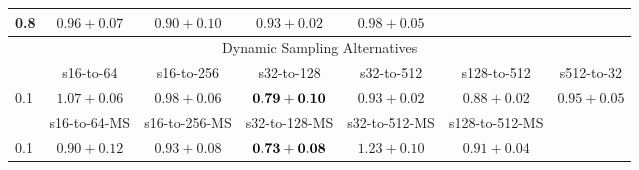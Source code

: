 \documentclass[10pt,journal,compsoc]{IEEEtran}
\begin{document}
\begin{table*}[!htbp]
\begin{center}
{\begin{tabular}{|l|c|c|c|c|c|c|}
0.8   & $0.96+0.07$ & $0.90+0.10$ & $0.93+0.02$ & $0.98+0.05$ & & \\
\hline
\multicolumn{7}{|c|}{Dynamic Sampling Alternatives}\\
\hline
& s16-to-64 & s16-to-256  & s32-to-128 & s32-to-512 & s128-to-512 & s512-to-32 \\
\hline
0.1  & $1.07+0.06$ & $0.98+0.06$ & $\bf 0.79+0.10$ &  $0.93+0.02$ & $0.88+0.02$ & $0.95+0.05$ \\
\hline
& s16-to-64-MS & s16-to-256-MS & s32-to-128-MS & s32-to-512-MS & s128-to-512-MS & \\
\hline
0.1  & $0.90+0.12$ & $0.93+0.08$ & $\bf 0.73+0.08$ &  $1.23+0.10$ & $0.91+0.04$ &  \\
\hline
\end{tabular}}
\end{center}
\end{table*}
\end{document}
